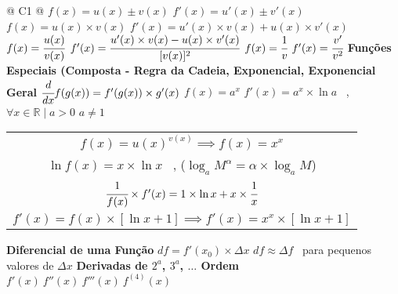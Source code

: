 \begin{longtable}{
		@{}
		C{1\textwidth} 
		@{}}
			{\large $f(x) = u(x) \pm v(x)$ \hspace{1cm} $f'(x) = u'(x) \pm v'(x)$}
			\tabularnewline
			\midrule
			{\large $f(x) = u(x) \times v(x)$ \hspace{1cm} $f'(x) = u'(x) \times v(x) + u(x) \times v'(x)$}
			\tabularnewline
			\midrule
			{\large $f(x) = \cfrac{u(x)}{v(x)}$ \hspace{1cm} $f'(x) = \cfrac{u'(x) \times v(x) - u(x) \times v'(x)}{[v(x)]^{2}}$}
			\tabularnewline
			\midrule
			{\large $f(x) = \cfrac{1}{v}$ \hspace{1cm} $f'(x) = \cfrac{v'}{v^{2}}$}
			\tabularnewline
			\midrule
			\textbf{Funções Especiais (Composta - Regra da Cadeia, Exponencial, Exponencial Geral}
			\tabularnewline
			\midrule
			{\large $\cfrac{d}{dx} f(g(x)) = f'(g(x)) \times g'(x)$}
			\tabularnewline
			\midrule
			{\large $f(x) = a^{x}$ \hspace{1cm} $f'(x) = a^{x} \times \ln a$ \ , $\forall x \in \mathbb{R} \mid a > 0$  $a \neq 1$}
			\tabularnewline
			\midrule
			{\large \begin{tabular}[c]{@{}c@{}} $f(x) = u(x)^{v(x)} \implies f(x) = x^{x}$ \\ $\ln f(x) = x \times \ln x$ \ , ($\log_{a} M^{\alpha} = \alpha \times \log_{a} M$) \\ $\cfrac{1}{f(x)} \times f'(x) = 1 \times \ln x + x \times \cfrac{1}{x}$ \\ $f'(x) = f(x) \times [\ln x +1] \implies f'(x) = x^{x} \times [\ln x + 1]$ \end{tabular}}
			\tabularnewline
			\midrule
			\textbf{Diferencial de uma Função}
			\tabularnewline
			\midrule
			{\large $df = f'(x_{0}) \times \Delta x$ \hspace{1cm} $df \approx \Delta f$ \ para pequenos valores de $\Delta x$}
			\tabularnewline
			\midrule
			\textbf{Derivadas de $2^{a}$, $3^{a}$, $\dots$ Ordem}
			\tabularnewline
			\midrule
			{\large $f'(x) \ f''(x) \ f'''(x) \ f^{(4)}(x)$}
			\tabularnewline
			\bottomrule

		\end{longtable}
		

